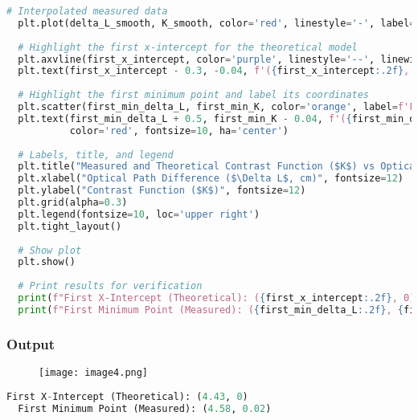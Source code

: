 \documentclass[a4paper,11pt]{article}
\begin{document}
\begin{lstlisting}[language=Python]
  # Interpolated measured data
  plt.plot(delta_L_smooth, K_smooth, color='red', linestyle='-', label=f'Interpolated Measured Data (L = {L_coherence:.2f} cm)')
  
  # Highlight the first x-intercept for the theoretical model
  plt.axvline(first_x_intercept, color='purple', linestyle='--', linewidth=0.8)
  plt.text(first_x_intercept - 0.3, -0.04, f'({first_x_intercept:.2f}, 0)', color='purple', fontsize=10, ha='center')
  
  # Highlight the first minimum point and label its coordinates
  plt.scatter(first_min_delta_L, first_min_K, color='orange', label=f'First Minimum: ({first_min_delta_L:.2f}, {first_min_K:.2f})')
  plt.text(first_min_delta_L + 0.5, first_min_K - 0.04, f'({first_min_delta_L:.2f}, {first_min_K:.2f})', 
           color='red', fontsize=10, ha='center')
  
  # Labels, title, and legend
  plt.title("Measured and Theoretical Contrast Function ($K$) vs Optical Path Difference ($\Delta L$)", fontsize=14)
  plt.xlabel("Optical Path Difference ($\Delta L$, cm)", fontsize=12)
  plt.ylabel("Contrast Function ($K$)", fontsize=12)
  plt.grid(alpha=0.3)
  plt.legend(fontsize=10, loc='upper right')
  plt.tight_layout()
  
  # Show plot
  plt.show()
  
  # Print results for verification
  print(f"First X-Intercept (Theoretical): ({first_x_intercept:.2f}, 0)")
  print(f"First Minimum Point (Measured): ({first_min_delta_L:.2f}, {first_min_K:.2f})")  
\end{lstlisting}
\label{code: Graphical representation of the contrast function}

\subsubsection*{Output}

\begin{figure}[H]
  \centering
  \texttt{[image: image4.png]}
\end{figure}

\begin{lstlisting}[language=Python]
  First X-Intercept (Theoretical): (4.43, 0)
  First Minimum Point (Measured): (4.58, 0.02)  
\end{lstlisting}
\newpage
\end{document}
